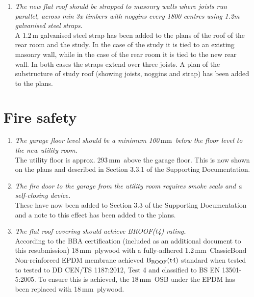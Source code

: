\documentclass{extension}
\newcommand{\mm}{\,$\mathrm{mm}$}
\begin{document}
\begin{enumerate}
\item {\it The new flat roof should be strapped to masonry walls where joists run parallel, across min 3x timbers with noggins every 1800 centres using 1.2m galvanised steel straps.}\\
A 1.2\,m galvanised steel strap has been added to the plans of the roof of the rear room and the study. In the case of the study it is tied to an existing masonry wall, while in the case of the rear room it is tied to the new rear wall. In both cases the straps extend over three joists. A plan of the substructure of study roof (showing joists, noggins and strap) has been added to the plans.
\end{enumerate}

\section{Fire safety}
\begin{enumerate}
\item {\it The garage floor level should be a minimum 100\mm\ below the floor level to the new utility room.}\\
The utility floor is approx. 293\mm\ above the garage floor. This is now shown on the plans and described in Section 3.3.1 of the Supporting Documentation.
\item {\it The fire door to the garage from the utility room requires smoke seals and a self-closing device.}\\
These have now been added to Section 3.3 of the Supporting Documentation and a note to this effect has been added to the plans.
\item {\it The flat roof covering should achieve BROOF(t4) rating.}\\According to the BBA certification (included as an additional document to this resubmission) 18\mm\ plywood with a fully-adhered 1.2\mm\ ClassicBond Non-reinforced EPDM membrane achieved ${\rm B_{ROOF}(t4)}$ standard when tested to tested to DD CEN/TS 1187:2012, Test 4 and classified to BS EN 13501-5:2005. To ensure this is achieved, the 18\mm\ OSB under the EPDM has been replaced with 18\mm\ plywood.
\end{enumerate}
\end{document}
